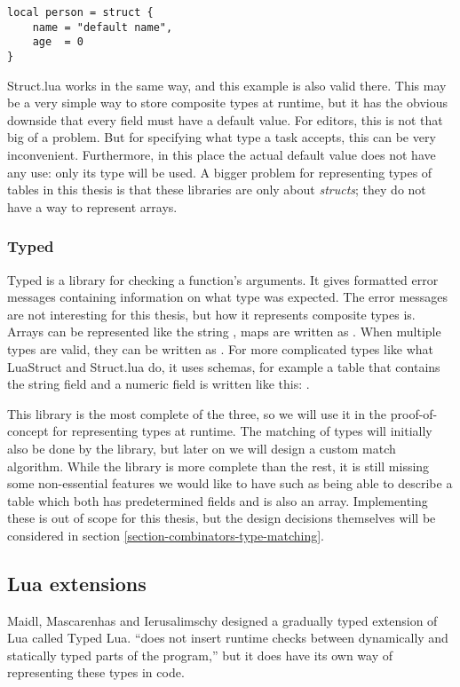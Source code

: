 \medskip
\begin{verbatim}
local person = struct {
    name = "default name",
    age  = 0
}
\end{verbatim}

Struct.lua works in the same way, and this example is also valid there. This may be a very simple way to store composite types at runtime, but it has the obvious downside that every field must have a default value. For editors, this is not that big of a problem. But for specifying what type a task accepts, this can be very inconvenient. Furthermore, in this place the actual default value does not have any use: only its type will be used. A bigger problem for representing types of tables in this thesis is that these libraries are only about \textit{structs}; they do not have a way to represent arrays.

\subsubsection{Typed}
Typed is a library for checking a function's arguments. It gives formatted error messages containing information on what type was expected. The error messages are not interesting for this thesis, but how it represents composite types is. Arrays can be represented like the string , maps are written as . When multiple types are valid, they can be written as . For more complicated types like what LuaStruct and Struct.lua do, it uses schemas, for example a table that contains the string field  and a numeric field  is written like this: .

This library is the most complete of the three, so we will use it in the proof-of-concept for representing types at runtime. The matching of types will initially also be done by the library, but later on we will design a custom match algorithm. While the library is more complete than the rest, it is still missing some non-essential features we would like to have such as being able to describe a table which both has predetermined fields and is also an array. Implementing these is out of scope for this thesis, but the design decisions themselves will be considered in section \ref{section-combinators-type-matching}.

\subsection{Lua extensions}
Maidl, Mascarenhas and Ierusalimschy \cite{maidl2014typed} designed a gradually typed extension of Lua called Typed Lua. ``does not insert runtime checks between dynamically and statically typed parts of the program,'' but it does have its own way of representing these types in code.

